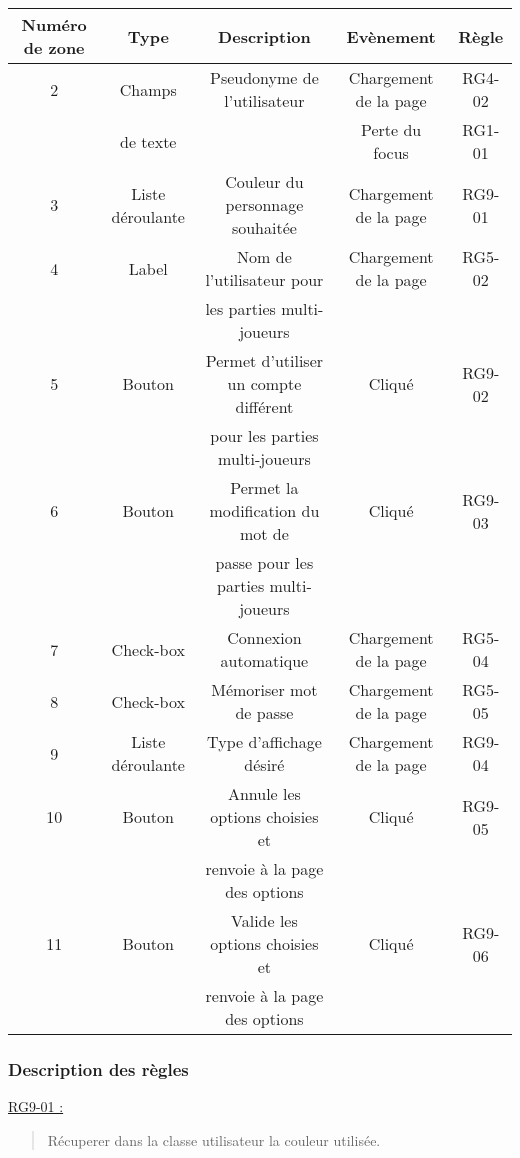 \documentclass{report}
\begin{document}
			\begin{tabular}{|c|c|c|c|c|} \hline
				Numéro de zone & Type  & Description & Evènement &	Règle \\\hline
				2 & Champs   & Pseudonyme de l'utilisateur & Chargement de la page & RG4-02 \\
				  & de texte &                             & Perte du focus & RG1-01 \\\hline
				3 & Liste déroulante & Couleur du personnage souhaitée & Chargement de la page & RG9-01 \\\hline
				4 & Label & Nom de l'utilisateur pour & Chargement de la page & RG5-02 \\
				  &       & les parties multi-joueurs & & \\\hline
				5 & Bouton & Permet d'utiliser un compte différent & Cliqué & RG9-02 \\
				  &        & pour les parties multi-joueurs & & \\\hline
				6 & Bouton & Permet la modification du mot de & Cliqué & RG9-03 \\
				  &        & passe pour les parties multi-joueurs & & \\\hline
				7 & Check-box & Connexion automatique & Chargement de la page & RG5-04 \\\hline
				8 & Check-box & Mémoriser mot de passe & Chargement de la page & RG5-05 \\\hline
				9 & Liste déroulante & Type d'affichage désiré & Chargement de la page & RG9-04 \\\hline
				10 & Bouton & Annule les options choisies et & Cliqué & RG9-05 \\
				   &        & renvoie à la page des options &  &  \\\hline
				11 & Bouton & Valide les options choisies et & Cliqué & RG9-06 \\
				   &        & renvoie à la page des options &  & \\\hline


			\end{tabular}
			
		\subsubsection{Description des règles}

			\underline{RG9-01 :}
				\begin{quote}
					Récuperer dans la classe utilisateur la couleur utilisée.
				\end{quote}
\end{document}
